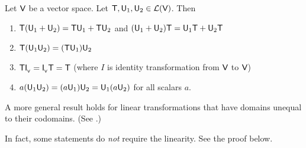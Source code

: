 \begin{theorem} \label{thm 2.10}
Let \(\textsf{V}\) be a vector space. Let \(\textsf{T}, \textsf{U}_1, \textsf{U}_2 \in \mathcal{L}(\textsf{V})\).
Then
\begin{enumerate}
\item \(\textsf{T}(\textsf{U}_1 + \textsf{U}_2) = \textsf{T}\textsf{U}_1 + \textsf{T}\textsf{U}_2\) and \((\textsf{U}_1 + \textsf{U}_2)\textsf{T} = \textsf{U}_1\textsf{T} + \textsf{U}_2\textsf{T}\)
\item \(\textsf{T}(\textsf{U}_1 \textsf{U}_2) = (\textsf{T}\textsf{U}_1)\textsf{U}_2\)
\item \(\textsf{T} \textsf{I}_{_{\textsf{V}}} = \textsf{I}_{_{\textsf{V}}} \textsf{T} = \textsf{T}\) (where \(I\) is identity transformation from \(\textsf{V}\) to \(\textsf{V}\))
\item \(a(\textsf{U}_1\textsf{U}_2) = (a\textsf{U}_1)\textsf{U}_2 = \textsf{U}_1(a\textsf{U}_2)\) for all scalars \(a\).
\end{enumerate}
\sloppy A more general result holds for linear transformations that have domains unequal to their codomains. (See .)
\end{theorem}

\begin{note}
In fact, some statements do \emph{not} require the linearity.
See the proof below.
\end{note}

